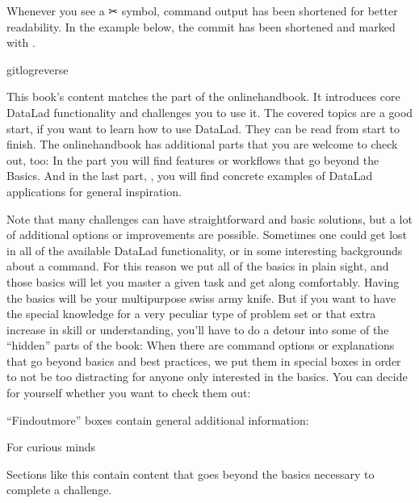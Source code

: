 \sphinxAtStartPar
Whenever you see a ✂ symbol, command output has been shortened for better readability.
In the example below, the commit {\hyperref[\detokenize{glossary:term-shasum}]{}} has been shortened and marked with .

\begin{sphinxVerbatim}[commandchars=\\\{\}]
gitlog\PYGZhy{}\PYGZhy{}reverse
\end{sphinxVerbatim}

\sphinxAtStartPar
This book’s content matches the  part of the online\sphinxhyphen{}handbook.
It introduces core DataLad functionality and challenges you to use it.
The covered topics are a good start, if you want to learn how to use DataLad.
They can be read from start to finish.
The online\sphinxhyphen{}handbook has additional parts that you are welcome to check
out, too:
In the  part you will find features or workflows that go beyond the
Basics.
And in the last part, , you will find concrete examples of
DataLad applications for general inspiration.

\sphinxAtStartPar
Note that many challenges can have straightforward and basic solutions,
but a lot of additional options or improvements are possible.
Sometimes one could get lost in all of the available DataLad functionality,
or in some interesting backgrounds about a command.
For this reason we put all of the basics in plain sight, and those basics
will let you master a given task and get along comfortably.
Having the basics will be your multi\sphinxhyphen{}purpose swiss army knife.
But if you want to have the special knowledge for a very peculiar type
of problem set or that extra increase in skill or understanding,
you’ll have to do a detour into some of the “hidden” parts of the book:
When there are command options or explanations that go beyond basics and
best practices, we put them in special boxes in order
to not be too distracting for anyone only interested in the basics.
You can decide for yourself whether you want to check them out:

\sphinxAtStartPar
“Find\sphinxhyphen{}out\sphinxhyphen{}more” boxes contain general additional information:
\begin{findoutmore}[label={fom-intro}, before title={\thetcbcounter\ }, check odd page=true]{For curious minds}
\label{\detokenize{intro/narrative:fom-intro}}

\sphinxAtStartPar
Sections like this contain content that goes beyond the basics
necessary to complete a challenge.


\end{findoutmore}

